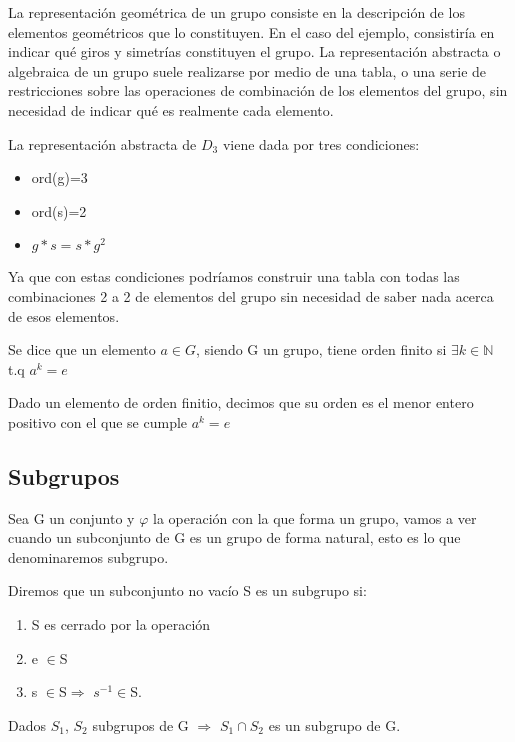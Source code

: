 \documentclass[a4paper,10pt]{apuntes}
\newenvironment{example}[1][Ejemplo]{\begin{trivlist}
\item[\hskip \labelsep {\bfseries #1}]}{\end{trivlist}}
\begin{document}
 La representación geométrica de un grupo consiste en la descripción de los elementos geométricos que lo constituyen. En el 
 caso del ejemplo, consistiría en indicar qué giros y simetrías constituyen el grupo.
 La representación abstracta o algebraica de un grupo suele realizarse por medio de una tabla, o una serie de restricciones sobre las operaciones
 de combinación de los elementos del grupo, sin necesidad de indicar qué es realmente cada elemento.
 \begin{example}
  La representación abstracta de $D_{3}$  viene dada por tres condiciones:
 \begin{itemize}
  \item ord(g)=3
  \item ord(s)=2
  \item $g*s=s*g^{2}$
 \end{itemize}
 Ya que con estas condiciones podríamos construir una tabla con todas las combinaciones 2 a 2 de elementos del grupo sin necesidad
 de saber nada acerca de esos elementos.
 \end{example}
 
 \begin{defn}
  Se dice que un elemento $a\in G$, siendo G un grupo, tiene orden finito si $\exists k\in\mathds{N}$  t.q  $a^{k}=e$
 \end{defn}
 
 \begin{defn}
  Dado un elemento de orden finitio, decimos que su orden es el menor entero positivo con el que se cumple $a^{k}=e$
 \end{defn}
\subsection{Subgrupos}
 Sea G un conjunto y $\varphi$  la operación con la que forma un grupo, vamos a ver cuando un subconjunto de G es un grupo de forma natural,
 esto es lo que denominaremos subgrupo.
 
 \begin{defn}
  Diremos que un subconjunto no vacío S es un subgrupo si:
  \begin{enumerate}
   \item S es cerrado por la operación
   \item e $\in$S
   \item s $\in$S$\Rightarrow$ $s^{-1}\in$S.
  \end{enumerate}
 \end{defn}
  \begin{theorem}
   Dados $S_{1}$, $S_{2}$ subgrupos de G $\Rightarrow$  $S_{1}\cap S_{2}$  es un subgrupo de G.
  \end{theorem}
\end{document}
